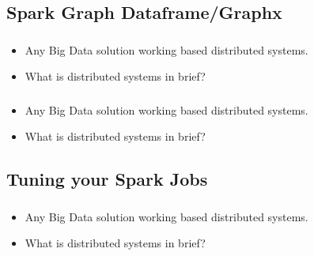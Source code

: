 \subsection{Spark Graph Dataframe/Graphx}

\begin{frame}
  \frametitle{\subsecname}
	\begin{itemize} 
		\item Any Big Data solution working based distributed systems.
		\item What is distributed systems in brief?
	\end{itemize}
\end{frame}


\begin{frame}
  \frametitle{\subsecname}
	\begin{itemize} 
		\item Any Big Data solution working based distributed systems.
		\item What is distributed systems in brief?
	\end{itemize}
\end{frame}



\subsection{Tuning your Spark Jobs}


\begin{frame}
  \frametitle{\subsecname}
	\begin{itemize} 
		\item Any Big Data solution working based distributed systems.
		\item What is distributed systems in brief?
	\end{itemize}
\end{frame}

